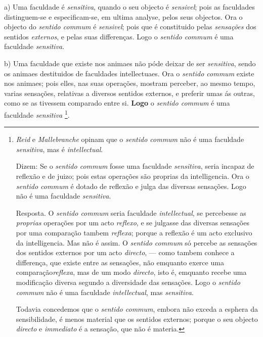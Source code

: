 

a) Uma faculdade é \emph{sensitiva}, quando o seu objecto é \emph{sensivel}; pois as faculdades distinguem-se e especificam-se, em ultima analyse, pelos seus objectos. Ora o objecto do \emph{sentido commum} é \emph{sensivel}; pois que é constituido pelas \emph{sensações} dos sentidos \emph{externos}, e pelas suas differenças. Logo o \emph{sentido commum} é uma faculdade \emph{sensitiva}.

b) Uma faculdade que existe nos animaes não póde deixar de ser \emph{sensitiva}, sendo os animaes destituidos de faculdades intellectuaes. Ora o \emph{sentido commum} existe nos animaes; pois elles, nas suas operações, mostram perceber, ao mesmo tempo, varias sensações, relativas a diversos sentidos externos, e preferir umas ás outras, como se as tivessem comparado entre si. \textbf{Logo} o \emph{sentido commum} é uma faculdade \emph{sensitiva} \footnote{\emph{Reid} e \emph{Mallebranche} opinam que o \emph{sentido commum} não é uma faculdade \emph{sensitiva}, mas é \emph{intellectual}.\par Dizem: Se o \emph{sentido commum} fosse uma faculdade \emph{sensitiva}, seria incapaz de reflexão e de juizo; pois estas operações são proprias da intelligencia. Ora o \emph{sentido commum} é dotado de reflexão e julga das diversas sensações. Logo não é uma faculdade \emph{sensitiva}.\par Resposta. O \emph{sentido commum} seria faculdade \emph{intellectual}, se percebesse as \emph{proprias} operações por um acto \emph{reflexo}, e se julgasse das diversas sensações por uma comparação tambem \emph{reflexa}; porque a reflexão é um acto exclusivo da intelligencia. Mas não é assim. O \emph{sentido commum} só percebe as sensações dos sentidos externos por um acto \emph{directo}, --- como tambem conhece a differença, que existe entre as sensações, não emquanto exerce uma comparação\emph{reflexa}, mas de um modo \emph{directo}, isto é, emquanto recebe uma modificação diversa segundo a diversidade das sensações. Logo o \emph{sentido commum} não é uma faculdade \emph{intellectual}, mas \emph{sensitiva}.\par Todavia concedemos que o \emph{sentido commum}, embora não exceda a esphera da sensibilidade, é menos material que os sentidos externos; porque o seu objecto \emph{directo} e \emph{immediato} é a sensação, que não é materia.}.


